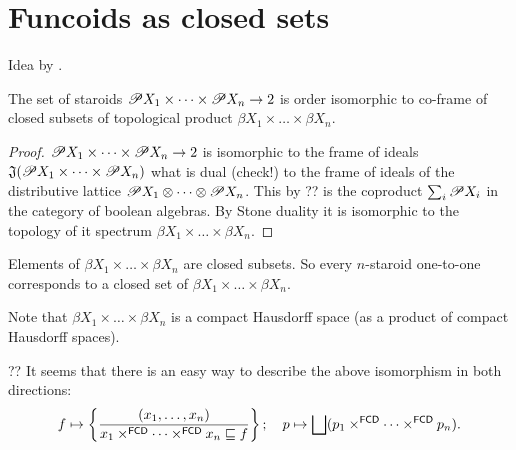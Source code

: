 \chapter{Funcoids as closed sets}

Idea \cite{nlab-topogeny} by .



\begin{thm}
The set of staroids
$\mathscr{P} X_1\times\dots\times\mathscr{P} X_n\to 2$ is
order isomorphic to co-frame of closed subsets of topological
product $\beta X_1\times\dots\times\beta X_n$.
\end{thm}

\begin{proof}
$\mathscr{P} X_1\times\dots\times\mathscr{P} X_n\to 2$ is isomorphic to
the frame of ideals
$\mathfrak{J}(\mathscr{P} X_1\times\dots\times\mathscr{P} X_n)$ what is
dual (check!) to the frame of ideals of the distributive lattice
$\mathscr{P} X_1\otimes\dots\otimes\mathscr{P} X_n$.
This by ?? is the coproduct $\sum_i \mathscr{P} X_i$ in the category
of boolean algebras.
By Stone duality it is isomorphic to the topology of it spectrum
$\beta X_1\times\dots\times\beta X_n$.
\end{proof}

Elements of $\beta X_1\times\dots\times\beta X_n$ are closed
subsets. So every $n$-staroid one-to-one corresponds to a closed
set of $\beta X_1\times\dots\times\beta X_n$.

Note that $\beta X_1\times\dots\times\beta X_n$ is a compact
Hausdorff space (as a product of compact Hausdorff spaces).

?? It seems that there is an easy way to describe the above isomorphism
in both directions:
\[
f\mapsto
\setcond{(x_1,\dots,x_n)}{
x_1\times^{\mathsf{FCD}}\dots\times^{\mathsf{FCD}}x_n\sqsubseteq f};\quad
p\mapsto \bigsqcup(p_1\times^{\mathsf{FCD}}\dots\times^{\mathsf{FCD}}p_n).
\]

